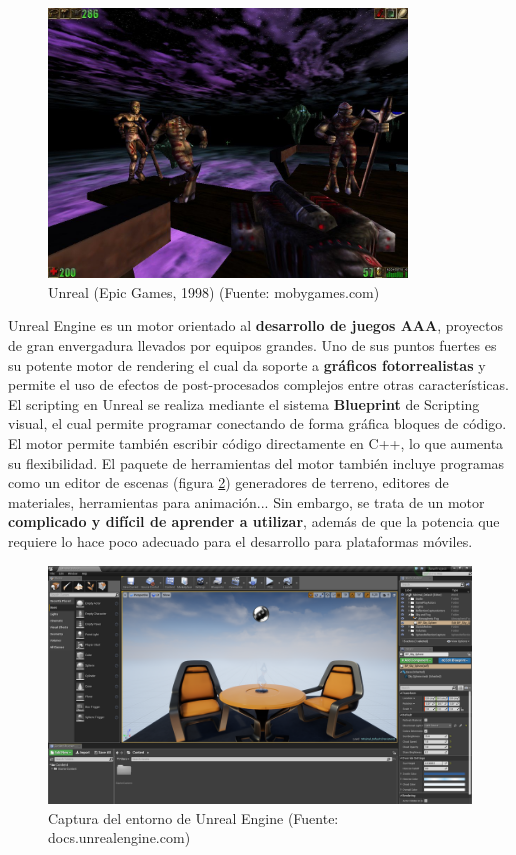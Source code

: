 \begin{figure}[h]
	\includegraphics[width=0.85\textwidth]{images/estadodelarte/motores/unreal-original}
    \caption{Unreal (Epic Games, 1998) (Fuente: mobygames.com)}
	\centering
	\label{unreal-original}
\end{figure}

Unreal Engine es un motor orientado al \textbf{desarrollo de juegos AAA}, proyectos de gran envergadura llevados por equipos grandes. Uno de sus puntos fuertes es su potente motor de rendering el cual da soporte a \textbf{gráficos fotorrealistas} y permite el uso de efectos de post-procesados complejos entre otras características. El scripting en Unreal se realiza mediante el sistema \textbf{Blueprint} de Scripting visual, el cual permite programar conectando de forma gráfica bloques de código. El motor permite también escribir código directamente en C++, lo que aumenta su flexibilidad. El paquete de herramientas del motor también incluye programas como un editor de escenas (figura \ref{captura-unreal}) generadores de terreno, editores de materiales, herramientas para animación... Sin embargo, se trata de un motor \textbf{complicado y difícil de aprender a utilizar}, además de que la potencia que requiere lo hace poco adecuado para el desarrollo para plataformas móviles.

\begin{figure}[h]
	\includegraphics[width=1\textwidth]{images/estadodelarte/motores/captura-unreal}
	\centering
	\caption{Captura del entorno de Unreal Engine (Fuente: docs.unrealengine.com)}
	\label{captura-unreal}
\end{figure}

